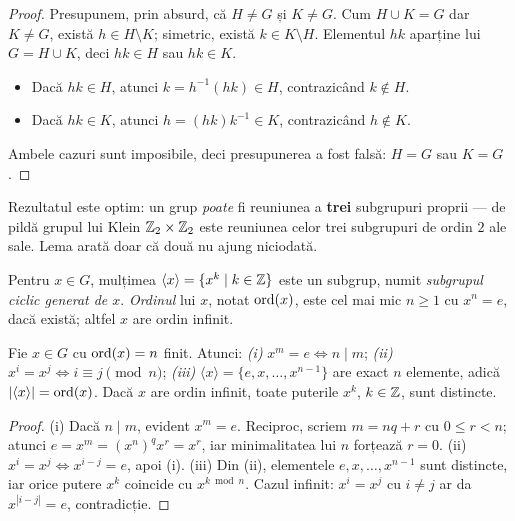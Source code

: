 \begin{proof}
Presupunem, prin absurd, că $H\neq G$ și $K\neq G$. Cum $H\cup K=G$ dar $K\neq G$, există $h\in H\setminus K$; simetric, există $k\in K\setminus H$. Elementul $hk$ aparține lui $G=H\cup K$, deci $hk\in H$ sau $hk\in K$.
\begin{itemize}[nosep,leftmargin=1.4em]
  \item Dacă $hk\in H$, atunci $k=h^{-1}(hk)\in H$, contrazicând $k\notin H$.
  \item Dacă $hk\in K$, atunci $h=(hk)k^{-1}\in K$, contrazicând $h\notin K$.
\end{itemize}
Ambele cazuri sunt imposibile, deci presupunerea a fost falsă: $H=G$ sau $K=G$.
\end{proof}

\begin{observatie}
Rezultatul este optim: un grup \emph{poate} fi reuniunea a \textbf{trei} subgrupuri proprii --- de pildă grupul lui Klein $\mathbb{Z}_2\times\mathbb{Z}_2$ este reuniunea celor trei subgrupuri de ordin $2$ ale sale. Lema arată doar că două nu ajung niciodată.
\end{observatie}

\begin{definitie}
Pentru $x\in G$, mulțimea $\langle x\rangle=\{x^k\mid k\in\mathbb{Z}\}$ este un subgrup, numit \emph{subgrupul ciclic generat de $x$}. \emph{Ordinul} lui $x$, notat $\operatorname{ord}(x)$, este cel mai mic $n\ge 1$ cu $x^n=e$, dacă există; altfel $x$ are ordin infinit.
\end{definitie}

\begin{teorema}\label{teo:ordin}
Fie $x\in G$ cu $\operatorname{ord}(x)=n$ finit. Atunci:
\emph{(i)} $x^m=e\iff n\mid m$;\quad
\emph{(ii)} $x^i=x^j\iff i\equiv j \pmod n$;\quad
\emph{(iii)} $\langle x\rangle=\{e,x,\dots,x^{n-1}\}$ are exact $n$ elemente, adică $|\langle x\rangle|=\operatorname{ord}(x)$.
Dacă $x$ are ordin infinit, toate puterile $x^k$, $k\in\mathbb{Z}$, sunt distincte.
\end{teorema}

\begin{proof}
(i) Dacă $n\mid m$, evident $x^m=e$. Reciproc, scriem $m=nq+r$ cu $0\le r<n$; atunci $e=x^m=(x^n)^q x^r=x^r$, iar minimalitatea lui $n$ forțează $r=0$. (ii) $x^i=x^j\iff x^{i-j}=e$, apoi (i). (iii) Din (ii), elementele $e,x,\dots,x^{n-1}$ sunt distincte, iar orice putere $x^k$ coincide cu $x^{k \bmod n}$. Cazul infinit: $x^i=x^j$ cu $i\neq j$ ar da $x^{|i-j|}=e$, contradicție.
\end{proof}

